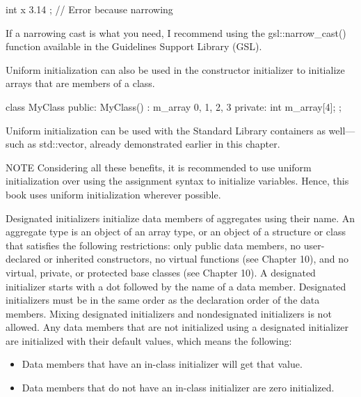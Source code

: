 \begin{cpp}
int x { 3.14 }; // Error because narrowing
\end{cpp}

If a narrowing cast is what you need, I recommend using the gsl::narrow\_cast() function available in the Guidelines Support Library (GSL).

Uniform initialization can also be used in the constructor initializer to initialize arrays that are members of a class.

\begin{cpp}
class MyClass
{
    public:
        MyClass()
            : m_array { 0, 1, 2, 3 }
        {
        }
    private:
        int m_array[4];
};
\end{cpp}

Uniform initialization can be used with the Standard Library containers as well—such as std::vector, already demonstrated earlier in this chapter.

\begin{myNotic}{NOTE}
Considering all these benefits, it is recommended to use uniform initialization over using the assignment syntax to initialize variables. Hence, this book uses uniform initialization wherever possible.
\end{myNotic}


Designated initializers initialize data members of aggregates using their name. An aggregate type is an object of an array type, or an object of a structure or class that satisfies the following restrictions: only public data members, no user-declared or inherited constructors, no virtual functions (see Chapter 10), and no virtual, private, or protected base classes (see Chapter 10). A designated initializer starts with a dot followed by the name of a data member. Designated initializers must be in the same order as the declaration order of the data members. Mixing designated initializers and nondesignated initializers is not allowed. Any data members that are not initialized using a designated initializer are initialized with their default values, which means the following:

\begin{itemize}
\item
Data members that have an in-class initializer will get that value.

\item
Data members that do not have an in-class initializer are zero initialized.
\end{itemize}

